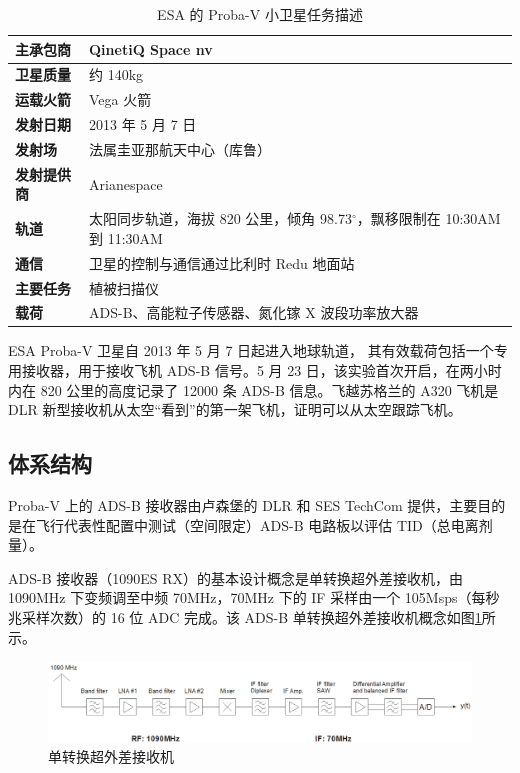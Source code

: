 \renewcommand\arraystretch{1.5}
\begin{table}[htbp]
\centering
\caption{ESA 的 Proba-V 小卫星任务描述}
\label{tab:esa_Proba-V_mission}
\begin{tabular}[b]{|p{2.5cm}<{\raggedleft}|p{12cm}<{\raggedright}|}
\hline
\textbf{主承包商} & QinetiQ Space nv \\
\hline
\textbf{卫星质量} & 约 140kg\\
\hline
\textbf{运载火箭 }& Vega 火箭\\
\hline
\textbf{发射日期} & 2013 年 5 月 7 日 \\
\hline
\textbf{发射场} & 法属圭亚那航天中心（库鲁）\\
\hline
\textbf{发射提供商} & Arianespace \\
\hline
\textbf{轨道} & 太阳同步轨道，海拔 820 公里，倾角 98.73$^\circ$，飘移限制在 10:30AM 到 11:30AM  \\
\hline
\textbf{通信} & 卫星的控制与通信通过比利时 Redu 地面站 \\
\hline
\textbf{主要任务} & 植被扫描仪 \\
\hline
\textbf{载荷} & ADS-B、高能粒子传感器、氮化镓 X 波段功率放大器 \\
\hline
\end{tabular}
\end{table}

ESA Proba-V 卫星自 2013 年 5 月 7 日起进入地球轨道， 其有效载荷包括一个专用接收器，用于接收飞机 ADS-B 信号。5 月 23 日，该实验首次开启，在两小时内在 820 公里的高度记录了 12000 条 ADS-B 信息。飞越苏格兰的 A320 飞机是 DLR 新型接收机从太空“看到”的第一架飞机，证明可以从太空跟踪飞机。


\subsection{体系结构}

Proba-V 上的 ADS-B 接收器由卢森堡的 DLR 和 SES TechCom 提供，主要目的是在飞行代表性配置中测试（空间限定）ADS-B 电路板以评估 TID（总电离剂量）。

ADS-B 接收器（1090ES RX）的基本设计概念是单转换超外差接收机，由 1090MHz 下变频调至中频 70MHz，70MHz 下的 IF 采样由一个 105Msps（每秒兆采样次数）的 16 位 ADC 完成。该 ADS-B 单转换超外差接收机概念如图\ref{fig:dlr_ads-b_receiver}所示。

\begin{figure}[htbp]
\centering
\includegraphics[width=15cm]{pic/dlr_ads-b_receiver.png}
\caption{单转换超外差接收机}
\label{fig:dlr_ads-b_receiver}
\end{figure}


